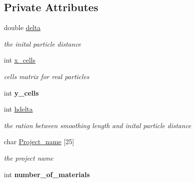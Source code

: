 \subsection*{Private Attributes}
\begin{CompactItemize}
\item 
\hypertarget{classDiagnose_ff5505506d498c9a3d41a15b848f4fed}{
double \hyperlink{classDiagnose_ff5505506d498c9a3d41a15b848f4fed}{delta}}
\label{classDiagnose_ff5505506d498c9a3d41a15b848f4fed}

\begin{CompactList}\small\item\em the inital particle distance \item\end{CompactList}\item 
\hypertarget{classDiagnose_392e23f84c8d6c19a62ff729dabc4b08}{
int \hyperlink{classDiagnose_392e23f84c8d6c19a62ff729dabc4b08}{x\_\-cells}}
\label{classDiagnose_392e23f84c8d6c19a62ff729dabc4b08}

\begin{CompactList}\small\item\em cells matrix for real particles \item\end{CompactList}\item 
\hypertarget{classDiagnose_b99ebe8786c68b5ef9477c49e32227ad}{
int \textbf{y\_\-cells}}
\label{classDiagnose_b99ebe8786c68b5ef9477c49e32227ad}

\item 
\hypertarget{classDiagnose_85b126f2b079c38847e1b8a42fe39604}{
int \hyperlink{classDiagnose_85b126f2b079c38847e1b8a42fe39604}{hdelta}}
\label{classDiagnose_85b126f2b079c38847e1b8a42fe39604}

\begin{CompactList}\small\item\em the ration between smoothing length and inital particle distance \item\end{CompactList}\item 
\hypertarget{classDiagnose_ea27d34fbb662ee394b81802ddeca495}{
char \hyperlink{classDiagnose_ea27d34fbb662ee394b81802ddeca495}{Project\_\-name} \mbox{[}25\mbox{]}}
\label{classDiagnose_ea27d34fbb662ee394b81802ddeca495}

\begin{CompactList}\small\item\em the project name \item\end{CompactList}\item 
\hypertarget{classDiagnose_e91dcce776e5182100a0d813c7a490c9}{
int \textbf{number\_\-of\_\-materials}}
\label{classDiagnose_e91dcce776e5182100a0d813c7a490c9}


\end{CompactItemize}
